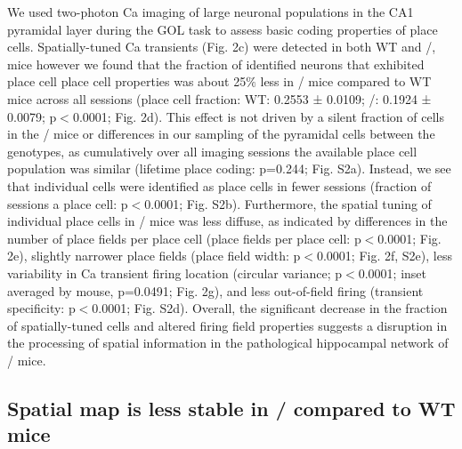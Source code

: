 We used two-photon Ca imaging of large neuronal populations in the CA1 pyramidal layer during the GOL task to assess basic coding properties of place cells. Spatially-tuned Ca transients \citep{Dombeck2007} (Fig. 2c) were detected in both WT and \df/, mice however we found that the fraction of identified neurons that exhibited place cell place cell properties was about 25$\%$ less in \df/ mice compared to WT mice across all sessions (place cell fraction: WT: 0.2553 ± 0.0109; \df/: 0.1924 ± 0.0079; p$<$0.0001; Fig. 2d).  This effect is not driven by a silent fraction of cells in the \df/ mice or differences in our sampling of the pyramidal cells between the genotypes, as cumulatively over all imaging sessions the available place cell population was similar (lifetime place coding: p=0.244; Fig. S2a). Instead, we see that individual cells were identified as place cells in fewer sessions (fraction of sessions a place cell: p$<$0.0001; Fig. S2b). Furthermore, the spatial tuning of individual place cells in \df/ mice was less diffuse, as indicated by differences in the number of place fields per place cell (place fields per place cell: p$<$0.0001; Fig. 2e), slightly narrower place fields (place field width: p$<$0.0001; Fig. 2f, S2e), less variability in Ca transient firing location (circular variance; p$<$0.0001; inset averaged by mouse, p=0.0491; Fig. 2g), and less out-of-field firing (transient specificity: p$<$0.0001; Fig. S2d).  Overall, the significant decrease in the fraction of spatially-tuned cells and altered firing field properties suggests a disruption in the processing of spatial information in the pathological hippocampal network of \df/ mice.

\subsection{Spatial map is less stable in \df/ compared to WT mice}

